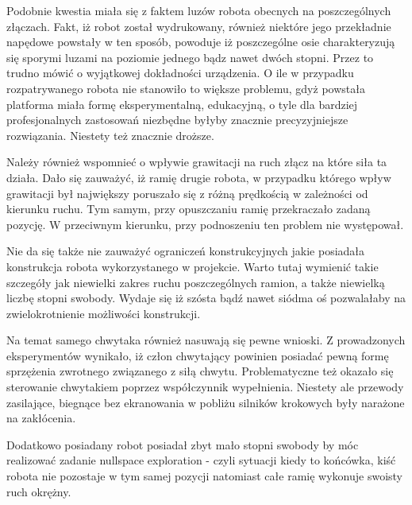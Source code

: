 Podobnie kwestia miała się z faktem luzów robota obecnych na poszczególnych złączach. Fakt, iż robot został wydrukowany, również niektóre jego przekładnie napędowe powstały w ten sposób, powoduje iż poszczególne osie charakteryzują się sporymi luzami na poziomie jednego bądz nawet dwóch stopni. Przez to trudno mówić o wyjątkowej dokładności urządzenia. O ile w przypadku rozpatrywanego robota nie stanowiło to większe problemu, gdyż powstała platforma miała formę eksperymentalną, edukacyjną, o tyle dla bardziej profesjonalnych zastosowań niezbędne byłyby znacznie precyzyjniejsze rozwiązania. Niestety też znacznie droższe. 

Należy również wspomnieć o wpływie grawitacji na ruch złącz na które siła ta działa. Dało się zauważyć, iż ramię drugie robota, w przypadku którego wpływ grawitacji był największy poruszało się z różną prędkością w zależności od kierunku ruchu. Tym samym, przy opuszczaniu ramię przekraczało zadaną pozycję. W przeciwnym kierunku, przy podnoszeniu ten problem nie występował.

Nie da się także nie zauważyć ograniczeń konstrukcyjnych jakie posiadała konstrukcja robota wykorzystanego w projekcie. Warto tutaj wymienić takie szczegóły jak niewielki zakres ruchu poszczególnych ramion, a także niewielką liczbę stopni swobody. Wydaje się iż szósta bądź nawet siódma oś pozwalałaby na zwielokrotnienie możliwości konstrukcji.

Na temat samego chwytaka również nasuwają się pewne wnioski. Z prowadzonych eksperymentów wynikało, iż człon chwytający powinien posiadać pewną formę sprzężenia zwrotnego związanego z siłą chwytu. Problematyczne też okazało się sterowanie chwytakiem poprzez współczynnik wypełnienia. Niestety ale przewody zasilające, biegnące bez ekranowania w pobliżu silników krokowych były narażone na zakłócenia. 

Dodatkowo posiadany robot posiadał zbyt mało stopni swobody by móc realizować zadanie nullspace exploration - czyli sytuacji kiedy to końcówka, kiść robota nie pozostaje w tym samej pozycji natomiast całe ramię wykonuje swoisty ruch okrężny. \cite{latex_code}